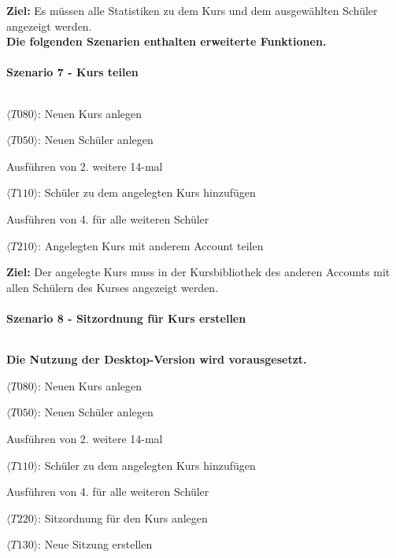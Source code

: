         \textbf{\sffamily Ziel:} Es müssen alle Statistiken zu dem Kurs und dem ausgewählten Schüler angezeigt werden.\\

    \textbf{Die folgenden Szenarien enthalten erweiterte Funktionen.}

    \paragraph{Szenario 7 - Kurs teilen} $~$ 
        
        
        \begin{test7}
            \item $\langle T080 \rangle$: Neuen Kurs anlegen
            \item $\langle T050 \rangle$: Neuen Schüler anlegen
            \item Ausführen von 2. weitere 14-mal
            \item $\langle T110 \rangle$: Schüler zu dem angelegten Kurs hinzufügen
            \item Ausführen von 4. für alle weiteren Schüler
            \item $\langle T210 \rangle$: Angelegten Kurs mit anderem \Gls{Account} teilen
        \end{test7}
        
        \textbf{\sffamily Ziel:} Der angelegte Kurs muss in der Kursbibliothek des anderen \Gls{Account}s mit allen Schülern des Kurses angezeigt werden.

    \newpage
        
    \paragraph{Szenario 8 - Sitzordnung für Kurs erstellen} $~$ 

        \textbf{Die Nutzung der \Gls{Desktop}-Version wird vorausgesetzt.}
        
        
        \begin{test8}
            \item $\langle T080 \rangle$: Neuen Kurs anlegen
            \item $\langle T050 \rangle$: Neuen Schüler anlegen
            \item Ausführen von 2. weitere 14-mal
            \item $\langle T110 \rangle$: Schüler zu dem angelegten Kurs hinzufügen
            \item Ausführen von 4. für alle weiteren Schüler
            \item $\langle T220 \rangle$: Sitzordnung für den Kurs anlegen
            \item $\langle T130 \rangle$: Neue Sitzung erstellen
        \end{test8}
        

